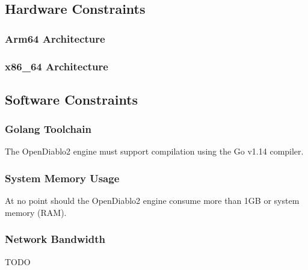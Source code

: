 \subsection{Hardware Constraints}
\subsubsection{Arm64 Architecture}
\subsubsection{x86\_64 Architecture}







\subsection{Software Constraints}

\subsubsection{Golang Toolchain}
The OpenDiablo2 engine must support compilation using the Go v1.14 compiler.


\subsubsection{System Memory Usage}
At no point should the OpenDiablo2 engine consume more than 1GB or system memory (RAM).

\subsubsection{Network Bandwidth}
TODO
